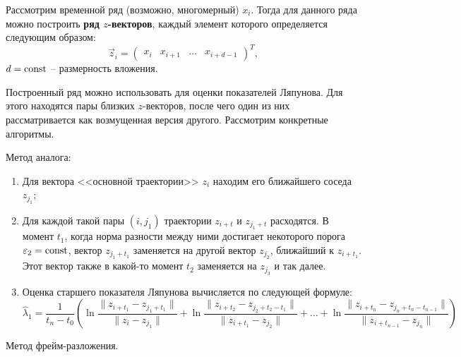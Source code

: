 
Рассмотрим временной ряд (возможно, многомерный) $x_i$. Тогда для данного ряда можно построить \textbf{ряд $z$-векторов}, каждый элемент которого определяется следующим образом:
\begin{equation*}
    \vec z_i = \begin{pmatrix}
        x_i & x_{i+1} & \dots & x_{i+d-1}
    \end{pmatrix}^T,
\end{equation*}
$d = \mathrm{const}$ -- размерность вложения.

Построенный ряд можно использовать для оценки показателей Ляпунова. Для этого находятся пары близких $z$-векторов, после чего один из них рассматривается как возмущенная версия другого. Рассмотрим конкретные алгоритмы.

Метод аналога:
\begin{enumerate}
\item
    Для вектора <<основной траектории>> $z_i$ находим его ближайшего соседа $z_{j_1}$;
\item
    Для каждой такой пары $(i, j_1)$ траектории $z_{i+t}$ и $z_{j_1+t}$ расходятся.
    В момент $t_1$, когда норма разности между ними достигает некоторого порога $\varepsilon_2 = \mathrm{const}$, вектор $z_{j_1+t_1}$ заменяется на другой вектор $z_{j_2}$, ближайший к $z_{i+t_1}$.
    Этот вектор также в какой-то момент $t_2$ заменяется на $z_{j_3}$ и так далее.
\item
    Оценка старшего показателя Ляпунова вычисляется по следующей формуле:
    \begin{equation*}
        \hat{\lambda}_1 = 
        \frac{1}{t_n - t_0} \left(
            \ln \frac{\|z_{i+t_1} - z_{j_1+t_1}\|}{\|z_{i} - z_{j_1}\|} +
            \ln \frac{\|z_{i+t_2} - z_{j_2+t_2-t_1}\|}{\|z_{i+t_1} - z_{j_2}\|} +
            \dots +
            \ln \frac{\|z_{i+t_n} - z_{j_n+t_n-t_{n-1}}\|}{\|z_{i+t_{n-1}} - z_{j_n}\|}
        \right)
    \end{equation*}
\end{enumerate}


Метод фрейм-разложения.
